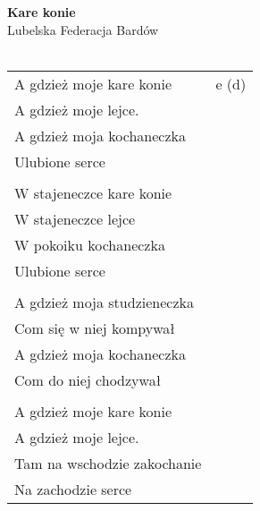 \documentclass[a5paper]{article}
\begin{document}


\noindent
\fontsize{12pt}{15pt}\selectfont
\textbf{Kare konie} \\
\fontsize{8pt}{10pt}\selectfont
Lubelska Federacja Bardów \\ \\
\fontsize{10pt}{12pt}\selectfont
{}
\begin{tabular}{@{}p{6.50cm}p{3cm}@{}}
\noindent
A gdzież moje kare konie & e (d) \\
A gdzież moje lejce. \\
A gdzież moja kochaneczka \\
Ulubione serce \\ \\

W stajeneczce kare konie \\
W stajeneczce lejce \\
W pokoiku kochaneczka \\
Ulubione serce \\\\

A gdzież moja studzieneczka \\
Com się w niej kompywał \\
A gdzież moja kochaneczka \\
Com do niej chodzywał \\ \\

A gdzież moje kare konie \\
A gdzież moje lejce. \\
Tam na wschodzie zakochanie \\
Na zachodzie serce
\end{tabular}
\end{document}
